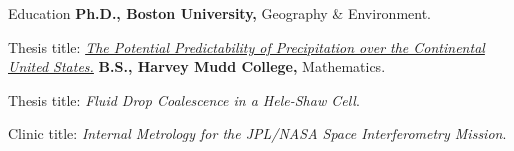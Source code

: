 \begin{rubric}{Education}
\entry*[2011 -- 2016]%
	\textbf{Ph.D., Boston University,} Geography \& Environment.
	\par Thesis title: \href{https://open.bu.edu/handle/2144/19726}{\emph{The Potential Predictability of Precipitation over the Continental United States.}}
%
% 
\entry*[1999 -- 2003]%
	\textbf{B.S., Harvey Mudd College,} Mathematics.
	\par Thesis title: \emph{Fluid Drop Coalescence in a Hele-Shaw Cell}.
    \par Clinic title: \emph{Internal Metrology for the JPL/NASA Space Interferometry Mission}.
%
\end{rubric}